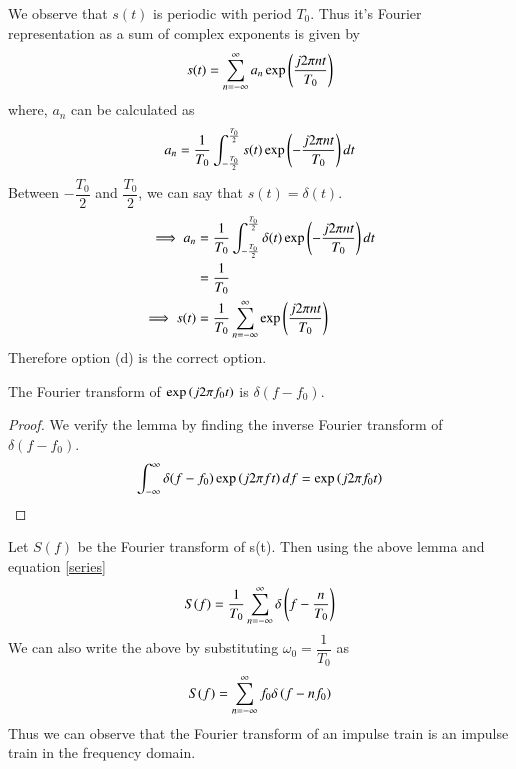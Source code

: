 \documentclass[journal,12pt,twocolumn]{IEEEtran}
\begin{document}
We observe that $s(t)$ is periodic with period $T_0$. Thus it's Fourier representation as a sum of complex exponents is given by
\begin{equation}
    s(t) = \sum_{n=-\infty}^{\infty}a_n\exp\left(\dfrac{j2\pi nt}{T_0}\right)
\end{equation}
where, $a_n$ can be calculated as
\begin{equation}
    a_n = \dfrac{1}{T_0}\int_{-\frac{T_0}{2}}^{\frac{T_0}{2}}s(t)\exp\left(-\dfrac{j2\pi nt}{T_0}\right)dt
\end{equation}
Between $-\dfrac{T_0}{2}$ and $\dfrac{T_0}{2}$, we can say that $s(t) = \delta(t)$.
\begin{align}
    \implies a_n &= \dfrac{1}{T_0}\int_{-\frac{T_0}{2}}^{\frac{T_0}{2}}\delta(t)\exp\left(-\dfrac{j2\pi nt}{T_0}\right)dt\\
        &= \dfrac{1}{T_0}\\
    \implies s(t) &= \dfrac{1}{T_0}\sum_{n=-\infty}^{\infty}\exp\left(\dfrac{j2\pi nt}{T_0}\right)\label{series}
\end{align}
Therefore option (d) is the correct option.
\begin{lemma}
The Fourier transform of $\exp \left(j2\pi f_0t\right)$ is $\delta(f-f_0)$.
\end{lemma}
\begin{proof}
We verify the lemma by finding the inverse Fourier transform of $\delta(f-f_0)$.
\begin{align}
    \int_{-\infty}^{\infty}\delta(f-f_0)\exp \left(j2\pi f t\right)df = \exp \left(j2\pi f_0 t\right)
\end{align}
\end{proof}
Let $S(f)$ be the Fourier transform of s(t). Then using the above lemma and equation \ref{series}
\begin{equation}
    S(f) = \dfrac{1}{T_0}\sum_{n=-\infty}^{\infty}\delta\left(f-\dfrac{n}{T_0}\right)
\end{equation}
We can also write the above by substituting $\omega_0 = \dfrac{1}{T_0}$ as
\begin{equation}
    S(f) = \sum_{n=-\infty}^{\infty}f_0\delta\left(f-nf_0\right)
\end{equation}
Thus we can observe that the Fourier transform of an impulse train is an impulse train in the frequency domain.
\end{document}

